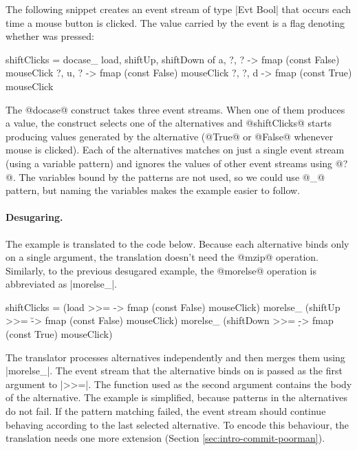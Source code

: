 \documentclass[preprint]{sigplanconf}
\begin{document}
The following snippet creates an event stream of type |Evt Bool| that occurs each time a mouse 
button is clicked. The value carried by the event is a flag denoting whether  was
pressed:

\begin{code}
shiftClicks = docase_ load, shiftUp, shiftDown of
  a, ?, ?  -> fmap (const False) mouseClick
  ?, u, ?  -> fmap (const False) mouseClick
  ?, ?, d  -> fmap (const True) mouseClick
\end{code}
The @docase@ construct takes three event streams. When one of them produces a value,
the construct selects one of the alternatives and @shiftClicks@ starts producing values generated
by the alternative (@True@ or @False@ whenever mouse is clicked). Each of the alternatives matches
on just a single event stream (using a variable pattern) and ignores the values of other event 
streams using @?@. The variables bound by the patterns are not used, so we could use @_@ pattern, 
but naming the variables makes the example easier to follow.

\paragraph{Desugaring.}
The example is translated to the code below. Because each alternative binds only
on a single argument, the translation doesn't need the @mzip@ operation. Similarly, to the 
previous desugared example, the @morelse@ operation is abbreviated as |morelse_|.

\begin{code}
shiftClicks = 
  (load >>= \a -> fmap (const False) mouseClick)  morelse_
  (shiftUp >>= \u -> fmap (const False) mouseClick) morelse_
  (shiftDown >>= \d -> fmap (const True) mouseClick)
\end{code}
The translator processes alternatives independently and then merges them using |morelse_|. The 
event stream that the alternative binds on is passed as the first argument to |>>=|. The function 
used as the second argument contains the body of the alternative. 
The example is simplified, because patterns in the alternatives do not fail. If the pattern matching
failed, the event stream should continue behaving according to the last selected alternative. To
encode this behaviour, the translation needs one more extension (Section \ref{sec:intro-commit-poorman}).
\end{document}

